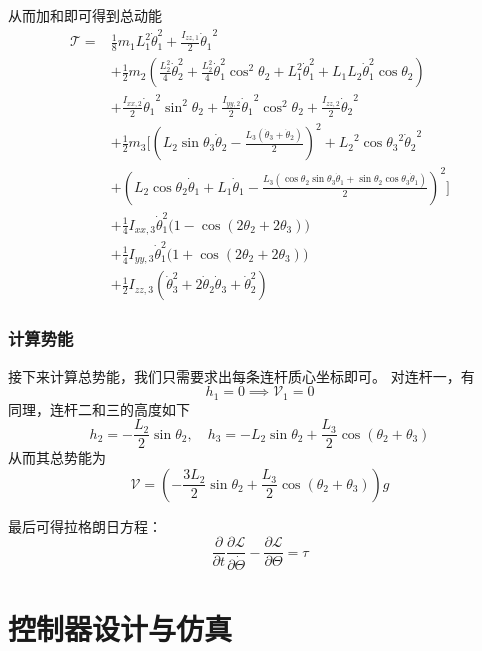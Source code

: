 \documentclass{ctexart}
\begin{document}
从而加和即可得到总动能
\[
    \begin{aligned}
        \mathcal T = & \frac{1}{8} m_1 L_1^2 \dot\theta_1^2 + \frac{I_{zz,1}}{2} {\dot \theta_1}^2 \\
        & + \frac{1}{2} m_2 (\frac{L_2^2}{4} \dot \theta_2^2 + \frac{L_2^2}{4}\dot\theta_1^2 \cos^2 \theta_2 + L_1^2 \dot\theta_1^2 + L_1 L_2 \dot\theta_1^2 \cos\theta_2) \\
        & + \frac{I_{xx,2}}{2} {\dot\theta_1}^2 \sin^2\theta_2+ \frac{I_{yy,2}}{2} {\dot\theta_1}^2 \cos^2\theta_2 + \frac{I_{zz,2}}{2} {\dot\theta_2}^2\\
        & + \frac{1}{2} m_3 \Big[ {{\left( {L_2} \sin\theta_3 \dot\theta_2-\frac{{L_3} \left( \dot\theta_3+\dot\theta_2\right) }{2}\right) }^{2}}+{{{L_2}}^{2}} {{\cos\theta_3}^{2}} {{\dot\theta_2}^{2}} \\ 
        &+ {{\left( {L_2} \cos\theta_2 \dot\theta_1 + L_1 \dot \theta_1 -\frac{{L_3} \left( \cos\theta_2 \sin\theta_3 \dot\theta_1+\sin\theta_2 \cos\theta_3 \dot\theta_1\right) }{2}\right) }^{2}} \Big] \\
        &+ \frac{1}{4} I_{xx,3} \dot\theta_1^2 \big( 1 - \cos(2\theta_2 + 2\theta_3) \big) \\
        &+ \frac{1}{4} I_{yy,3} \dot\theta_1^2 \big( 1 + \cos(2\theta_2 + 2\theta_3) \big) \\
        &+ \frac{1}{2} I_{zz,3} (\dot\theta_3^2 + 2 \dot\theta_2 \dot\theta_3 + \dot\theta_2^2)
    \end{aligned}
\]

\subsubsection{计算势能}

接下来计算总势能，我们只需要求出每条连杆质心坐标即可。
对连杆一，有
\[ h_1 = 0 \implies \mathcal V_1 = 0\]
同理，连杆二和三的高度如下
\[
    h_2 = - \frac{L_2}{2} \sin \theta_2,\quad h_3 = - L_2 \sin \theta_2 + \frac{L_3}{2} \cos(\theta_2+\theta_3)
\]
从而其总势能为
\[
    \mathcal V = (- \frac{3L_2}{2} \sin \theta_2 + \frac{L_3}{2} \cos(\theta_2+\theta_3))g
\]

最后可得拉格朗日方程：
\[
    \frac{\partial}{\partial t} \frac{\partial \mathcal L}{\partial \dot \Theta} - \frac{\partial \mathcal L}{\partial \Theta} = \tau
\]

\section{控制器设计与仿真}
\end{document}
